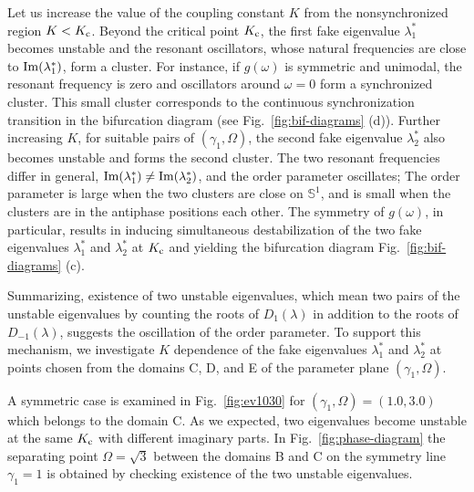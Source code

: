 Let us increase the value of the coupling constant $K$
from the nonsynchronized region $K<K_{\rm c}$.
Beyond the critical point $K_{\rm c}$,
the first fake eigenvalue $\lambda_{1}^{\ast}$ becomes unstable
and the resonant oscillators,
whose natural frequencies are close to ${\rm Im}(\lambda_{1}^{\ast})$,
form a cluster.
For instance, if $g(\omega)$ is symmetric and unimodal,
the resonant frequency is zero
and oscillators around $\omega=0$ form a synchronized cluster.
This small cluster corresponds to the continuous synchronization
transition in the bifurcation diagram (see Fig.~\ref{fig:bif-diagrams} (d)).
Further increasing $K$, for suitable pairs of $(\gamma_{1},\Omega)$,
the second fake eigenvalue $\lambda_{2}^{\ast}$ also becomes unstable
and forms the second cluster.
The two resonant frequencies differ in general,
${\rm Im}(\lambda_{1}^{\ast})\neq {\rm Im}(\lambda_{2}^{\ast})$,
and the order parameter oscillates;
The order parameter is large when the two clusters are close
on $\mathbb{S}^{1}$, and is small when the clusters are in the
antiphase positions each other.
The symmetry of $g(\omega)$, in particular, results
  in inducing simultaneous destabilization of the two fake
  eigenvalues $\lambda_{1}^{\ast}$ and $\lambda_{2}^{\ast}$ at $K_{\rm c}$
  and yielding the bifurcation diagram Fig.~\ref{fig:bif-diagrams} (c).

Summarizing, existence of two unstable eigenvalues,
which mean two pairs of the unstable eigenvalues
by counting the roots of $D_{1}(\lambda)$ in addition to
the roots of $D_{-1}(\lambda)$,
suggests the oscillation of the order parameter.
To support this mechanism,
we investigate $K$ dependence of the fake eigenvalues
$\lambda_{1}^{\ast}$ and $\lambda_{2}^{\ast}$
at points chosen from the domains C, D, and E
of the parameter plane $(\gamma_{1},\Omega)$.


A symmetric case is examined in Fig.~\ref{fig:ev1030}
for $(\gamma_{1},\Omega)=(1.0,3.0)$ which belongs to the domain C.
As we expected, two eigenvalues become unstable
at the same $K_{\rm c}$ with different imaginary parts.
In Fig.~\ref{fig:phase-diagram}
the separating point $\Omega=\sqrt{3}$ between the domains B and C
on the symmetry line $\gamma_{1}=1$ is obtained
by checking existence of the two unstable eigenvalues.


